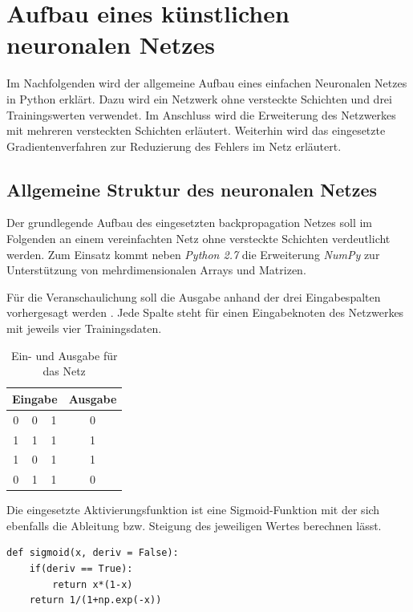\chapter{Aufbau eines künstlichen neuronalen Netzes}
Im Nachfolgenden wird der allgemeine Aufbau eines einfachen Neuronalen Netzes in Python erklärt. Dazu wird ein Netzwerk ohne versteckte Schichten und drei Trainingswerten verwendet. Im Anschluss wird die Erweiterung des Netzwerkes mit mehreren versteckten Schichten erläutert. Weiterhin wird das eingesetzte Gradientenverfahren zur Reduzierung des Fehlers im Netz erläutert.


\section{Allgemeine Struktur des neuronalen Netzes}
Der grundlegende Aufbau des eingesetzten backpropagation Netzes soll im Folgenden an einem vereinfachten Netz ohne versteckte Schichten verdeutlicht werden. Zum Einsatz kommt neben \emph{Python 2.7} die Erweiterung \emph{NumPy} zur Unterstützung von mehrdimensionalen Arrays und Matrizen.
 
Für die Veranschaulichung soll die Ausgabe anhand der drei Eingabespalten vorhergesagt werden . Jede Spalte steht für einen Eingabeknoten des Netzwerkes mit jeweils vier Trainingsdaten.

\begin{table}[h!]
	\centering	
	\begin{tabular}{c|c|c|c}
	  \multicolumn{3}{c|}{\textbf{Eingabe}} & \textbf{Ausgabe} \\ \hline 
    0 & 0 & 1 & 0 \\ \hline
    1 & 1 & 1 & 1 \\ \hline
    1 & 0 & 1 & 1 \\ \hline
    0 & 1 & 1 & 0 \\ \hline
	\end{tabular}
	\caption{Ein- und Ausgabe für das Netz}
	\label{sampledata}
\end{table}

Die eingesetzte Aktivierungsfunktion ist eine Sigmoid-Funktion  mit der sich ebenfalls die Ableitung bzw. Steigung des jeweiligen Wertes berechnen lässt.

\begin{lstlisting}[caption={Sigmoid-Funktion}, label={sigmoidcode}]
def sigmoid(x, deriv = False):
    if(deriv == True):
        return x*(1-x)
    return 1/(1+np.exp(-x))
\end{lstlisting}

